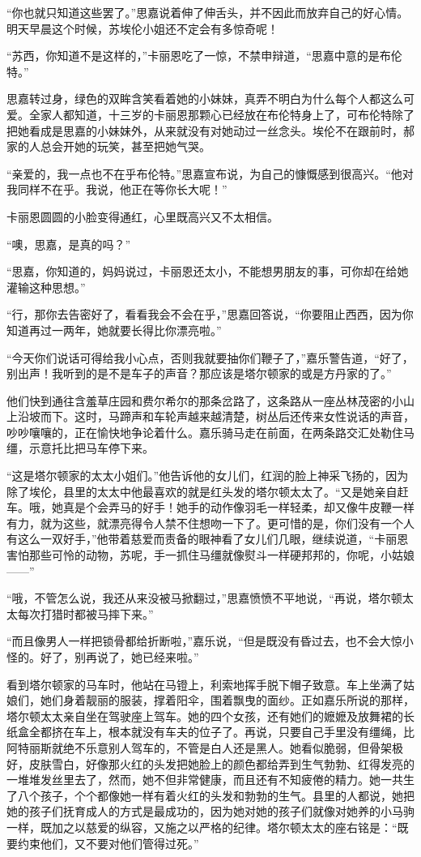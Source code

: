 \par “你也就只知道这些罢了。”思嘉说着伸了伸舌头，并不因此而放弃自己的好心情。明天早晨这个时候，苏埃伦小姐还不定会有多惊奇呢！
\par “苏西，你知道不是这样的，”卡丽恩吃了一惊，不禁申辩道，“思嘉中意的是布伦特。”
\par 思嘉转过身，绿色的双眸含笑看着她的小妹妹，真弄不明白为什么每个人都这么可爱。全家人都知道，十三岁的卡丽恩那颗心已经放在布伦特身上了，可布伦特除了把她看成是思嘉的小妹妹外，从来就没有对她动过一丝念头。埃伦不在跟前时，郝家的人总会开她的玩笑，甚至把她气哭。
\par “亲爱的，我一点也不在乎布伦特。”思嘉宣布说，为自己的慷慨感到很高兴。“他对我同样不在乎。我说，他正在等你长大呢！”
\par 卡丽恩圆圆的小脸变得通红，心里既高兴又不太相信。
\par “噢，思嘉，是真的吗？”
\par “思嘉，你知道的，妈妈说过，卡丽恩还太小，不能想男朋友的事，可你却在给她灌输这种思想。”
\par “行，那你去告密好了，看看我会不会在乎，”思嘉回答说，“你要阻止西西，因为你知道再过一两年，她就要长得比你漂亮啦。”
\par “今天你们说话可得给我小心点，否则我就要抽你们鞭子了，”嘉乐警告道，“好了，别出声！我听到的是不是车子的声音？那应该是塔尔顿家的或是方丹家的了。”
\par 他们快到通往含羞草庄园和费尔希尔的那条岔路了，这条路从一座丛林茂密的小山上沿坡而下。这时，马蹄声和车轮声越来越清楚，树丛后还传来女性说话的声音，吵吵嚷嚷的，正在愉快地争论着什么。嘉乐骑马走在前面，在两条路交汇处勒住马缰，示意托比把马车停下来。
\par “这是塔尔顿家的太太小姐们。”他告诉他的女儿们，红润的脸上神采飞扬的，因为除了埃伦，县里的太太中他最喜欢的就是红头发的塔尔顿太太了。“又是她亲自赶车。哦，她真是个会弄马的好手！她手的动作像羽毛一样轻柔，却又像牛皮鞭一样有力，就为这些，就漂亮得令人禁不住想吻一下了。更可惜的是，你们没有一个人有这么一双好手，”他带着慈爱而责备的眼神看了女儿们几眼，继续说道，“卡丽恩害怕那些可怜的动物，苏呢，手一抓住马缰就像熨斗一样硬邦邦的，你呢，小姑娘——”
\par “哦，不管怎么说，我还从来没被马掀翻过，”思嘉愤愤不平地说，“再说，塔尔顿太太每次打猎时都被马摔下来。”
\par “而且像男人一样把锁骨都给折断啦，”嘉乐说，“但是既没有昏过去，也不会大惊小怪的。好了，别再说了，她已经来啦。”
\par 看到塔尔顿家的马车时，他站在马镫上，利索地挥手脱下帽子致意。车上坐满了姑娘们，她们身着靓丽的服装，撑着阳伞，围着飘曳的面纱。正如嘉乐所说的那样，塔尔顿太太亲自坐在驾驶座上驾车。她的四个女孩，还有她们的嬷嬷及放舞裙的长纸盒全都挤在车上，根本就没有车夫的位子了。再说，只要自己手里没有缰绳，比阿特丽斯就绝不乐意别人驾车的，不管是白人还是黑人。她看似脆弱，但骨架极好，皮肤雪白，好像那火红的头发把她脸上的颜色都给弄到生气勃勃、红得发亮的一堆堆发丝里去了，然而，她不但非常健康，而且还有不知疲倦的精力。她一共生了八个孩子，个个都像她一样有着火红的头发和勃勃的生气。县里的人都说，她把她的孩子们抚育成人的方式是最成功的，因为她对她的孩子们就像对她养的小马驹一样，既加之以慈爱的纵容，又施之以严格的纪律。塔尔顿太太的座右铭是：“既要约束他们，又不要对他们管得过死。”
